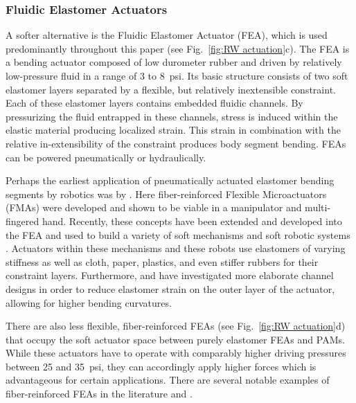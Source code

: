 \subsubsection{Fluidic Elastomer Actuators}
\label{subsubsec:RW FEA}
A softer alternative is the Fluidic Elastomer Actuator (FEA), which is used predominantly throughout this paper (see Fig.~\ref{fig:RW actuation}c).
The FEA is a bending actuator composed of low durometer rubber and driven by relatively low-pressure fluid in a range of 3 to 8~psi.
Its basic structure consists of two soft elastomer layers separated by a flexible, but relatively inextensible constraint.
Each of these elastomer layers contains embedded fluidic channels.
By pressurizing the fluid entrapped in these channels, stress is induced within the elastic material producing localized strain. This strain in combination with the relative in-extensibility of the constraint produces body segment bending.
FEAs can be powered pneumatically or hydraulically.

Perhaps the earliest application of pneumatically actuated elastomer bending segments by robotics was by \citet{suzumori1992applying}.
Here fiber-reinforced Flexible Microactuators (FMAs) were developed and shown to be viable in a manipulator and multi-fingered hand.
Recently, these concepts have been extended and developed into the FEA and used to build a variety of soft mechanisms \citep{shepherd2011multigait, ilievski2011soft, morin2012camouflage, martinez2013robotic, marchese2014autonomous, marchese2014design, marchese2014whole, katzschmann2014hydraulic, tolley2014untethered, katzschmann2015autonomous, marchese2015design, marchese2015control, marchese2015dynamics}
and soft robotic systems
\citep{onal2011soft, marchese2011soft, onal2013autonomous, marchese2014autonomous, marchese2014design, marchese2014whole, katzschmann2014hydraulic, tolley2014untethered, tolley2014resilient, katzschmann2015autonomous, marchese2015design, marchese2015control, marchese2015dynamics}.
Actuators within these mechanisms and these robots use elastomers of varying stiffness as well as cloth, paper, plastics, and even stiffer rubbers for their constraint layers.
Furthermore, \citet{polygerinos2013towards} and \citet{mosadegh2014pneumatic} have investigated more elaborate channel designs in order to reduce elastomer strain on the outer layer of the actuator, allowing for higher bending curvatures. 

There are also less flexible, fiber-reinforced FEAs (see Fig.~\ref{fig:RW actuation}d) that occupy the soft actuator space between purely elastomer FEAs and PAMs.
While these actuators have to operate with comparably higher driving pressures between 25 and 35~psi, they can accordingly apply higher forces which is advantageous for certain applications.
There are several notable examples of fiber-reinforced FEAs in the literature \citet{suzumori1992applying, suzumori2007bending, bishop2012design, galloway2013mechanically, deimel2013compliant, deimel2014novel} and \citet{park2014design}.

